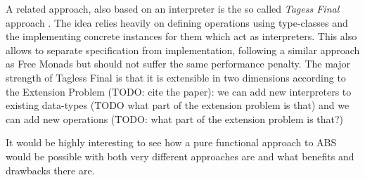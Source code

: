 
\medskip

A related approach, also based on an interpreter is the so called \textit{Tagess Final} approach \cite{kiselyov_typed_2012}. The idea relies heavily on defining operations using type-classes and the implementing concrete instances for them which act as interpreters. This also allows to separate specification from implementation, following a similar approach as Free Monads but should not suffer the same performance penalty. %
The major strength of Tagless Final is that it is extensible in two dimensions according to the Extension Problem (TODO: cite the paper): we can add new interpreters to existing data-types (TODO what part of the extension problem is that) and we can add new operations (TODO: what part of the extension problem is that?)

\medskip

It would be highly interesting to see how a pure functional approach to ABS would be possible with both very different approaches are and what benefits and drawbacks there are.


